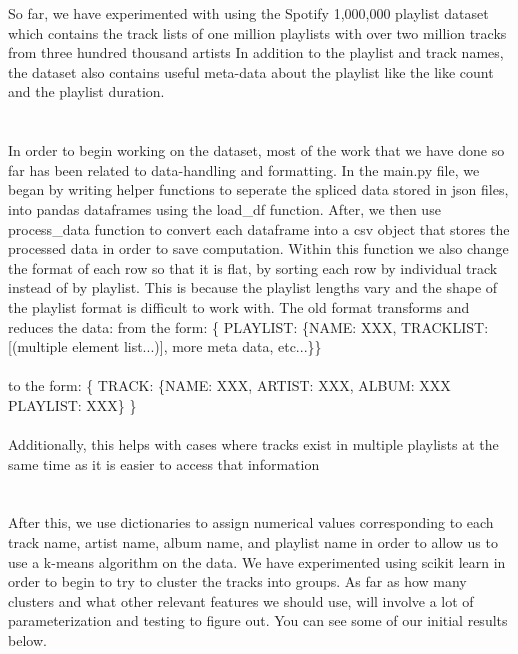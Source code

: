 \documentclass{article}
\begin{document}
So far, we have experimented with using the Spotify 1,000,000 playlist dataset which contains the track lists of one million playlists with over two million tracks from three hundred thousand artists
In addition to the playlist and track names, the dataset also contains useful meta-data about the playlist like the like count and the playlist duration. \\ \\ \\

In order to begin working on the dataset, most of the work that we have done so far has been related to data-handling and formatting. In the main.py file, we began by writing helper functions to seperate the
spliced data stored in json files, into pandas dataframes using the load\_df function. After, we then use process\_data function to convert each dataframe into a csv object that stores the processed data in order
to save computation. Within this function we also change the format of each row so that it is flat, by sorting each row by individual track instead of by playlist. This is because the playlist lengths vary and
the shape of the playlist format is difficult to work with. The old format transforms and reduces the data:
from the form: \{ PLAYLIST: \{NAME: XXX, TRACKLIST: [(multiple element list...)], more meta data, etc...\}\} \\ \\to the form: \{ TRACK: \{NAME: XXX, ARTIST: XXX, ALBUM: XXX PLAYLIST: XXX\} \} \\ \\ 
Additionally, this helps with cases where tracks exist in multiple playlists at the same time as it is easier to access that information \\ \\ \\

After this, we use dictionaries to assign numerical values corresponding to each track name, artist name, album name, and playlist name in order to allow us to use a k-means algorithm on the data. We have experimented
using scikit learn in order to begin to try to cluster the tracks into groups. As far as how many clusters and what other relevant features we should use, will involve a lot of parameterization and testing to figure out.
You can see some of our initial results below. \\ \\ \\
\end{document}
